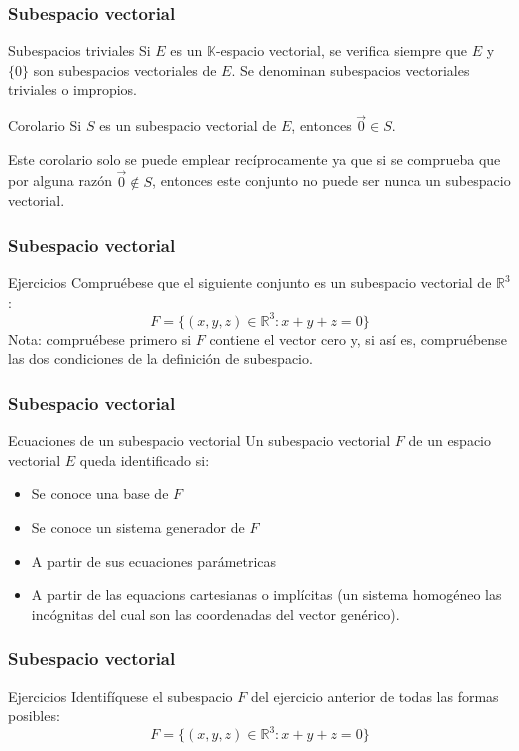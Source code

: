 \documentclass{beamer}
\begin{document}
\begin{frame}
  \frametitle{Subespacio vectorial}
\begin{block}{Subespacios triviales}
Si $E$ es un $\mathbb K$-espacio vectorial, se verifica siempre que $E$ y $\{0\}$ son subespacios vectoriales de $E$. Se denominan subespacios vectoriales triviales o impropios. \end{block}
\begin{block}{Corolario}
Si $S$ es un subespacio vectorial de $E$, entonces $\vec 0\in S$. \end{block}

Este corolario solo se puede emplear rec\'iprocamente ya que si se comprueba que por alguna raz\'on $\vec 0\notin S$, entonces este conjunto no puede ser nunca un subespacio vectorial.
\end{frame}


\begin{frame}
  \frametitle{Subespacio vectorial}
\begin{block}{Ejercicios}
Compru\'ebese que el siguiente conjunto es un subespacio vectorial de $\mathbb R^3$:
\[F=\{(x,y,z)\in \mathbb R^3: x+y+z=0\}\]
Nota: compru\'ebese primero si $F$ contiene el vector cero y, si as\'i es, compru\'ebense las dos condiciones de la definici\'on de subespacio.
\end{block}

\end{frame}

\begin{frame}
  \frametitle{Subespacio vectorial}
\begin{block}{Ecuaciones de un subespacio vectorial}
Un subespacio vectorial $F$ de un espacio vectorial $E$ queda identificado si:
\begin{itemize}
\item Se conoce una base de $F$
\item Se conoce un sistema generador de $F$
\item A partir de sus ecuaciones par\'ametricas
\item A partir de las equacions cartesianas o impl\'icitas (un sistema homog\'eneo las inc\'ognitas del cual son las coordenadas del vector gen\'erico).
\end{itemize}
\end{block}
\end{frame}


\begin{frame}
  \frametitle{Subespacio vectorial}

\begin{block}{Ejercicios}
Identif\'iquese el subespacio $F$ del ejercicio anterior de todas las formas posibles:
\[F=\{(x,y,z)\in \mathbb R^3: x+y+z=0\}\]
\end{block}

\end{frame}
\end{document}
